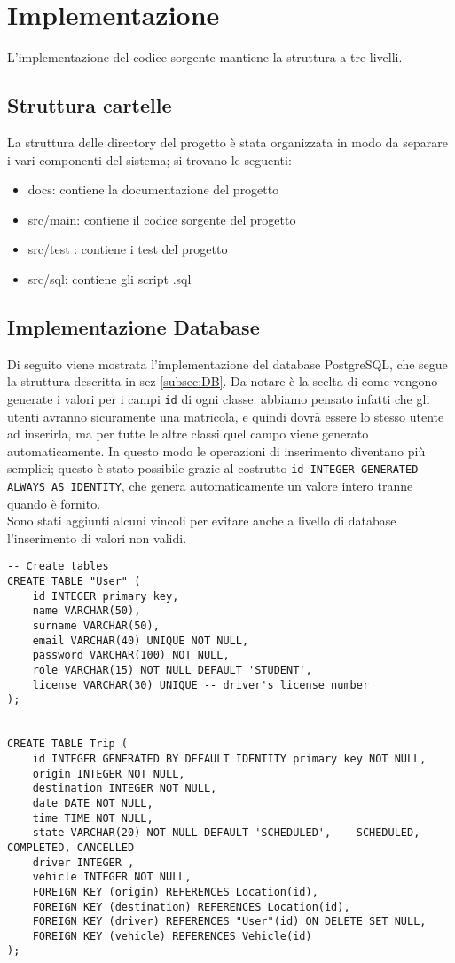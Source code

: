 \section{Implementazione}

L'implementazione del codice sorgente mantiene la struttura a tre livelli.
\subsection{Struttura cartelle}
La struttura delle directory del progetto è stata organizzata in modo da separare i vari componenti del sistema; si trovano le seguenti:
\begin{itemize}
    \item docs: contiene la documentazione del progetto
    \item src/main: contiene il codice sorgente del progetto
    \item src/test : contiene i test del progetto
    \item src/sql: contiene gli script .sql
\end{itemize}

\subsection{Implementazione Database}\label{subsec:DBimpl}
Di seguito viene mostrata l'implementazione del database PostgreSQL, che segue la struttura descritta in sez \ref{subsec:DB}.
Da notare è la scelta di come vengono generate i valori per i campi \texttt{id} di ogni classe: abbiamo pensato infatti che gli utenti avranno sicuramente una matricola, e quindi dovrà essere lo stesso utente ad inserirla, ma per tutte le altre classi quel campo viene generato automaticamente. In questo modo le operazioni di inserimento diventano più semplici; questo è stato possibile grazie al costrutto \texttt{id INTEGER GENERATED ALWAYS AS IDENTITY}, che genera automaticamente un valore intero tranne quando è fornito.\\
Sono stati aggiunti alcuni vincoli per evitare anche a livello di database l'inserimento di valori non validi.

\begin{lstlisting}[style=sql, caption={Esempio creazione tabelle User e Trip}]
-- Create tables
CREATE TABLE "User" (
    id INTEGER primary key, 
    name VARCHAR(50),
    surname VARCHAR(50),
    email VARCHAR(40) UNIQUE NOT NULL,
    password VARCHAR(100) NOT NULL, 
    role VARCHAR(15) NOT NULL DEFAULT 'STUDENT',
    license VARCHAR(30) UNIQUE -- driver's license number
);


CREATE TABLE Trip (
    id INTEGER GENERATED BY DEFAULT IDENTITY primary key NOT NULL,
    origin INTEGER NOT NULL,
    destination INTEGER NOT NULL,
    date DATE NOT NULL,
    time TIME NOT NULL,
    state VARCHAR(20) NOT NULL DEFAULT 'SCHEDULED', -- SCHEDULED, COMPLETED, CANCELLED
    driver INTEGER , 
    vehicle INTEGER NOT NULL,
    FOREIGN KEY (origin) REFERENCES Location(id),
    FOREIGN KEY (destination) REFERENCES Location(id),
    FOREIGN KEY (driver) REFERENCES "User"(id) ON DELETE SET NULL,
    FOREIGN KEY (vehicle) REFERENCES Vehicle(id)
);
\end{lstlisting}
